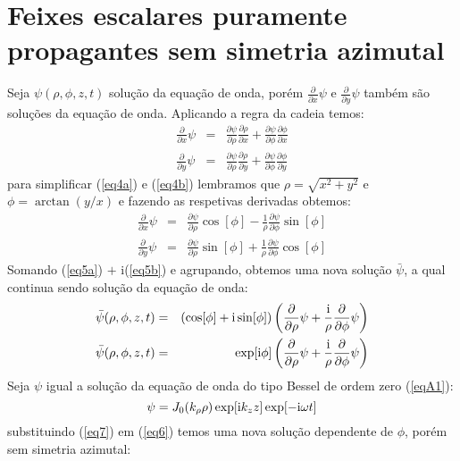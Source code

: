 \section{Feixes escalares puramente propagantes sem simetria azimutal}
Seja $\psi(\rho,\phi,z,t)$ solução da equação de onda, porém $\frac{\partial}{\partial x}\psi$ e $\frac{\partial}{\partial y}\psi$ também são soluções da equação de onda. Aplicando a regra da cadeia temos:
\begin{eqnarray}
  \frac{\partial}{\partial x}\psi& = &\frac{\partial\psi}{\partial \rho}\frac{\partial\rho}{\partial x}+\frac{\partial\psi}{\partial \phi}\frac{\partial\phi}{\partial x}  \label{eq4a}\\
      \frac{\partial}{\partial y}\psi& = &\frac{\partial\psi}{\partial \rho}\frac{\partial\rho}{\partial y}+\frac{\partial\psi}{\partial \phi}\frac{\partial\phi}{\partial y} \label{eq4b}
\end{eqnarray}
para simplificar (\ref{eq4a}) e (\ref{eq4b}) lembramos que $\rho=\sqrt{x^2+y^2}$ e $\phi=\arctan(y/x)$ e fazendo as respetivas derivadas obtemos:
\begin{eqnarray}
  \frac{\partial}{\partial x}\psi& = &\frac{\partial\psi}{\partial \rho}\cos[\phi]-\frac{1}{\rho}\frac{\partial\psi}{\partial \phi}\sin[\phi]  \label{eq5a}\\
      \frac{\partial}{\partial y}\psi& = &\frac{\partial\psi}{\partial \rho}\sin[\phi]+\frac{1}{\rho}\frac{\partial\psi}{\partial \phi}\cos[\phi] \label{eq5b}
\end{eqnarray}
Somando (\ref{eq5a}) $+$ {\rm i}(\ref{eq5b}) e agrupando, obtemos uma nova solu\c{c}\~ao $\bar{\psi}$, a qual continua sendo solução da equação de onda:
\begin{eqnarray}  
    \bar{\psi}(\rho,\phi,z,t)&=&\left( \cos[\phi]+{\rm i}\sin[\phi]\right)\left( \frac{\partial}{\partial \rho}\psi + \frac{{\rm i}}{\rho}\frac{\partial}{\partial\phi}\psi \right)\nonumber\\
    \bar{\psi}(\rho,\phi,z,t)&=&\exp[{\rm i}\phi]\left( \frac{\partial}{\partial \rho}\psi + \frac{{\rm i}}{\rho}\frac{\partial}{\partial\phi}\psi \right)\label{eq6}
\end{eqnarray}
Seja $\psi$ igual a solução da equação de onda do tipo Bessel de ordem zero (\ref{eqA1}):
\begin{equation}\label{eq7}
\psi =J_0(k_{\rho}\rho)\exp[{\rm i}k_z z]\exp[{-\rm i}\omega t]
\end{equation}
substituindo (\ref{eq7}) em (\ref{eq6}) temos uma nova solução dependente de $\phi$, porém sem simetria azimutal:
